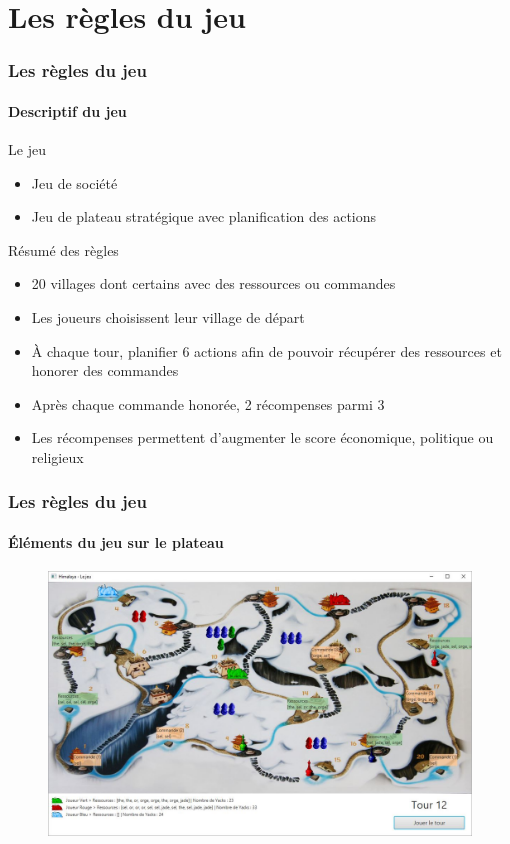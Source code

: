 \section{Les règles du jeu}

	\begin{frame}
	\frametitle{Les règles du jeu}
	\framesubtitle{Descriptif du jeu}
	
	\begin{block}{Le jeu}
		\begin{itemize}
			\item Jeu de société
			\item Jeu de plateau stratégique avec planification des actions
		\end{itemize}
	\end{block}
	
	\begin{block}{Résumé des règles}
		\begin{itemize}
			\item 20 villages dont certains avec des ressources ou commandes
			\item Les joueurs choisissent leur village de départ
			\item À chaque tour, planifier 6 actions afin de pouvoir récupérer des ressources et honorer des commandes
			\item Après chaque commande honorée, 2 récompenses parmi 3
			\item Les récompenses permettent d'augmenter le score économique, politique ou religieux
		\end{itemize}
	\end{block}
	
	\end{frame}


	\begin{frame}
		\frametitle{Les règles du jeu}
		\framesubtitle{Éléments du jeu sur le plateau}
		
		\begin{figure}[h]
		\centering
		\includegraphics[width=1\linewidth]{images/etat_jeu_avance}
		\label{fig:plateau}
		\end{figure}
	
	\end{frame}

